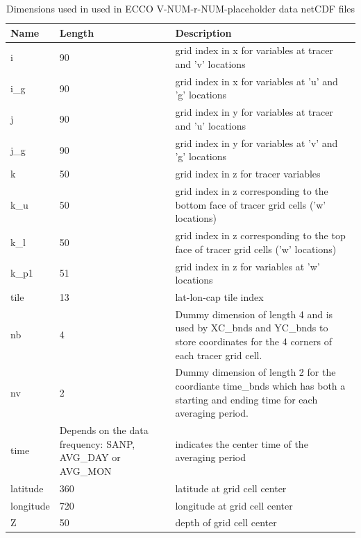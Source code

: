 \begin{longtable}{|p{}|p{}|m{}|}
\caption{Dimensions used in used in ECCO V-NUM-r-NUM-placeholder data netCDF files}
\label{tab:variable-attributes} \\ 
\hline \endfirsthead
\endhead
\endfoot
\hline \endlastfoot
\rowcolor{blue!25} \textbf{Name} & \textbf{Length} & \textbf{Description} \\ \hline
\rowcolor{magenta!25}
i & 90 & grid index in x for variables at tracer and 'v' locations \\ \hline
\rowcolor{magenta!25}
i\_g & 90 & grid index in x for variables at 'u' and 'g' locations \\ \hline
\rowcolor{magenta!25}
j & 90 & grid index in y for variables at tracer and 'u' locations \\ \hline
\rowcolor{magenta!25}
j\_g & 90 & grid index in y for variables at 'v' and 'g' locations \\ \hline
\rowcolor{magenta!25}
k & 50 & grid index in z for tracer variables \\ \hline
\rowcolor{magenta!25}
k\_u & 50 & grid index in z corresponding to the bottom face of tracer grid cells ('w' locations) \\ \hline
\rowcolor{magenta!25}
k\_l & 50 & grid index in z corresponding to the top face of tracer grid cells ('w' locations) \\ \hline
\rowcolor{magenta!25}
k\_p1 & 51 & grid index in z for variables at 'w' locations \\ \hline
\rowcolor{magenta!25}
tile & 13 & lat-lon-cap tile index \\ \hline
\rowcolor{magenta!25}
nb & 4 & Dummy dimension of length 4 and is used by XC\_bnds and YC\_bnds to store coordinates for the 4 corners of each tracer grid cell. \\ \hline
\rowcolor{magenta!25}
nv & 2 & Dummy dimension of length 2 for the coordiante time\_bnds which has both a starting and ending time for each averaging period. \\ \hline
\rowcolor{magenta!25}
time & Depends on the data frequency: SANP, AVG\_DAY or AVG\_MON & indicates the center time of the averaging period \\ \hline
\rowcolor{magenta!25}
latitude & 360 & latitude at grid cell center \\ \hline
\rowcolor{magenta!25}
longitude & 720 & longitude at grid cell center \\ \hline
\rowcolor{magenta!25}
Z & 50 & depth of grid cell center \\ \hline
\end{longtable}
